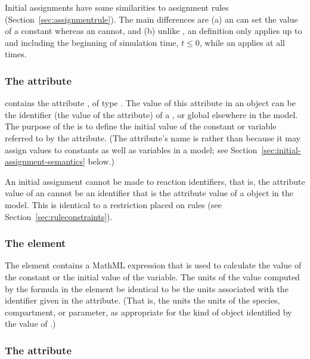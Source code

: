 Initial assignments have some similarities to assignment rules
(Section~\ref{sec:assignmentrule}).  The main differences are (a)
an \InitialAssignment can set the value of a constant whereas an
\AssignmentRule cannot, and (b) unlike \AssignmentRule, an
\InitialAssignment definition only applies up to and including the
beginning of simulation time, \ie $t \leq 0$, while an
\AssignmentRule applies at all times.


\subsubsection{The  attribute}

\InitialAssignment contains the attribute
, of type .  The value of this
attribute in an \InitialAssignment object can be the
identifier (\ie the value of the  attribute)
of a \Compartment, \Species or global \Parameter elsewhere in the
model.  The purpose of the \InitialAssignment is to define the
initial value of the constant or variable referred to by the
 attribute.  (The attribute's
name is  rather than  because it may
assign values to constants as well as variables in a model; see
Section~\ref{sec:initial-assignment-semantics} below.)

An initial assignment cannot be made to reaction identifiers, that
is, the  attribute value of an \InitialAssignment cannot
be an identifier that is the  attribute value of a \Reaction
object in the model.  This is identical to a restriction placed on
rules (see Section~\ref{sec:ruleconstraints}).


\subsubsection{The  element}

The  element contains a MathML expression that is used
to calculate the value of the constant or the initial value of the
variable.  The units of the value computed by the formula in the
 element  be identical to be the units associated with the
identifier given in the  attribute.  (That is, the units
 the units of the species, compartment, or parameter, as
appropriate for the kind of object identified by the value of
.)


\subsubsection{The  attribute}
\label{sec:initialassignment-sboterm}

